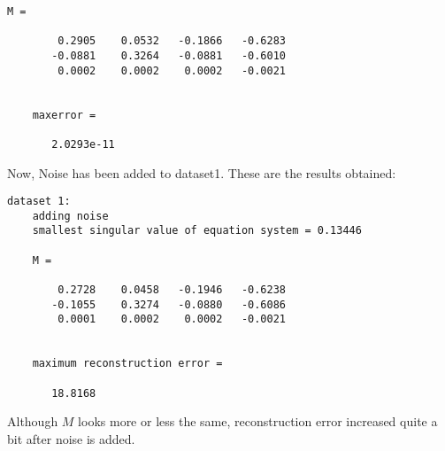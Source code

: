 \documentclass[11pt]{article}
\begin{document}
\begin{enumerate}
\begin{itemize}
\begin{Verbatim}[frame=single]
	M =

	    0.2905    0.0532   -0.1866   -0.6283
	   -0.0881    0.3264   -0.0881   -0.6010
	    0.0002    0.0002    0.0002   -0.0021


	maxerror =

	   2.0293e-11
	\end{Verbatim}

	Now, Noise has been added to dataset1. These are the results obtained: 
	\begin{Verbatim}[frame=single]
	dataset 1: 
	adding noise
	smallest singular value of equation system = 0.13446

	M =

	    0.2728    0.0458   -0.1946   -0.6238
	   -0.1055    0.3274   -0.0880   -0.6086
	    0.0001    0.0002    0.0002   -0.0021


	maximum reconstruction error =

	   18.8168
	\end{Verbatim}

	Although $M$ looks more or less the same, reconstruction error increased quite a bit after noise is added.
\end{itemize}



\end{enumerate}
\end{document}
